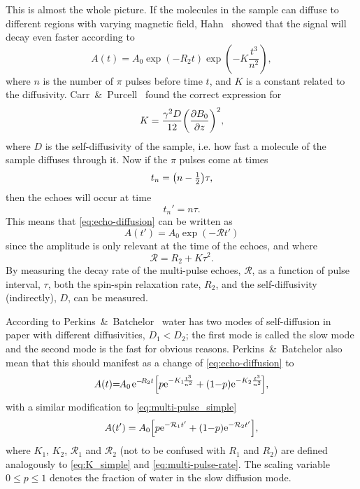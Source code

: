 \documentclass[11pt,a4paper, twocolumn,
swedish, english %
]{article}
\begin{document}
This is almost the whole picture. If the molecules in the sample can
diffuse to different regions with varying magnetic field,
Hahn~\cite{Hahn1950} showed that the signal will decay even faster
according to
\begin{equation}\label{eq:echo-diffusion}
A(t)=A_0\exp(-R_2t)
\exp(-K\frac{t^3}{n^2}),
\end{equation}
where $n$ is the number of $\pi$ pulses before time $t$, and $K$ is a
constant related to the diffusivity. Carr~\&~Purcell~\cite{Carr-Purcell1954} found the correct expression for
\begin{equation}\label{eq:K_simple}
K=\frac{\gamma^2D}{12}\qty(\pdv{B_0}{z})^2,
\end{equation}
where $D$ is the self-diffusivity of the sample, i.e. how fast a
molecule of the sample diffuses through it. Now if the $\pi$ pulses
come at times
\begin{equation}
t_{n}=\qty(n-\tfrac{1}{2})\tau,
\end{equation}
then the echoes will occur at time 
\begin{equation}
t_n'=n\tau.
\end{equation}
This means that \eqref{eq:echo-diffusion} can be written as
\begin{equation}\label{eq:multi-pulse_simple}
A(t')=A_0\exp(-\mathcal{R}t')
\end{equation}
since the amplitude is only relevant at the time of the echoes, and
where 
\begin{equation}\label{eq:multi-pulse-rate}
\mathcal{R}=R_2+K\tau^2.
\end{equation}
By measuring the decay rate of the multi-pulse echoes, $\mathcal{R}$,
as a function of pulse interval, $\tau$, both the spin-spin relaxation
rate, $R_2$, and the self-diffusivity (indirectly), $D$, can be measured.

According to Perkins~\&~Batchelor~\cite{Perkins-Batchelor2012} water
has two modes of self-diffusion in paper with different diffusivities,
$D_1<D_2$; the first mode is called the slow mode and the second mode
is the fast for obvious reasons. Perkins~\&~Batchelor also mean that
this should manifest as a change of 
\eqref{eq:echo-diffusion} to
\begin{equation}
\begin{aligned}
A(t){=}\hspace{-1pt}A_0\hspace{1pt}
\mathrm{e}^{{-}\!R_2t}\qty[
p\mathrm{e}^{{-}K_1\!\frac{t^3}{n^2}} + (1{-}p)\mathrm{e}^{{-}K_2\frac{t^3}{n^2}}
\!],
\end{aligned}
\end{equation}
with a similar modification to \eqref{eq:multi-pulse_simple}
\begin{equation}\label{eq:multi-pulse_dual}
A(t')=A_0\qty[p\mathrm{e}^{-\mathcal{R}_1t'}+
(1{-}p)\mathrm{e}^{-\mathcal{R}_2t'}],
\end{equation}
where $K_1$, $K_2$, $\mathcal{R}_1$ and $\mathcal{R}_2$ (not to be
confused with $R_1$ and $R_2$) are defined analogously to
\eqref{eq:K_simple} and \eqref{eq:multi-pulse-rate}. The
scaling variable $0\le p\le1$ denotes the fraction of water in the
slow diffusion mode. 
\end{document}
